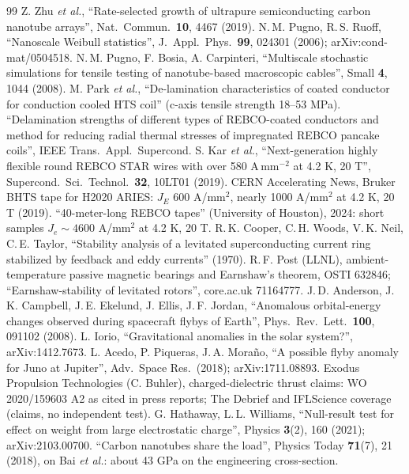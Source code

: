\begin{thebibliography}{99}
 Z. Zhu \emph{et al.}, ``Rate-selected growth of ultrapure semiconducting carbon nanotube arrays'', Nat.\ Commun.\ \textbf{10}, 4467 (2019).
 N.\,M. Pugno, R.\,S. Ruoff, ``Nanoscale Weibull statistics'', J.\ Appl.\ Phys.\ \textbf{99}, 024301 (2006); arXiv:cond-mat/0504518.
 N.\,M. Pugno, F. Bosia, A. Carpinteri, ``Multiscale stochastic simulations for tensile testing of nanotube-based macroscopic cables'', Small \textbf{4}, 1044 (2008).
 M. Park \emph{et al.}, ``De-lamination characteristics of coated conductor for conduction cooled HTS coil'' (c-axis tensile strength 18--53 MPa).
 ``Delamination strengths of different types of REBCO-coated conductors and method for reducing radial thermal stresses of impregnated REBCO pancake coils'', IEEE Trans.\ Appl.\ Supercond.
 S. Kar \emph{et al.}, ``Next-generation highly flexible round REBCO STAR wires with over 580 A\,mm$^{-2}$ at 4.2 K, 20 T'', Supercond.\ Sci.\ Technol.\ \textbf{32}, 10LT01 (2019).
 CERN Accelerating News, Bruker BHTS tape for H2020 ARIES: $J_E$ 600 A/mm$^2$, nearly 1000 A/mm$^2$ at 4.2 K, 20 T (2019).
 ``40-meter-long REBCO tapes'' (University of Houston), 2024: short samples $J_e\sim4600$ A/mm$^2$ at 4.2 K, 20 T.
 R.\,K. Cooper, C.\,H. Woods, V.\,K. Neil, C.\,E. Taylor, ``Stability analysis of a levitated superconducting current ring stabilized by feedback and eddy currents'' (1970).
 R.\,F. Post (LLNL), ambient-temperature passive magnetic bearings and Earnshaw's theorem, OSTI 632846; ``Earnshaw-stability of levitated rotors'', core.ac.uk 71164777.
 J.\,D. Anderson, J.\,K. Campbell, J.\,E. Ekelund, J. Ellis, J.\,F. Jordan, ``Anomalous orbital-energy changes observed during spacecraft flybys of Earth'', Phys.\ Rev.\ Lett.\ \textbf{100}, 091102 (2008).
 L. Iorio, ``Gravitational anomalies in the solar system?'', arXiv:1412.7673.
 L. Acedo, P. Piqueras, J.\,A. Mora\~no, ``A possible flyby anomaly for Juno at Jupiter'', Adv.\ Space Res.\ (2018); arXiv:1711.08893.
 Exodus Propulsion Technologies (C. Buhler), charged-dielectric thrust claims: WO 2020/159603 A2 as cited in press reports; The Debrief and IFLScience coverage (claims, no independent test).
 G. Hathaway, L.\,L. Williams, ``Null-result test for effect on weight from large electrostatic charge'', Physics \textbf{3}(2), 160 (2021); arXiv:2103.00700.
 ``Carbon nanotubes share the load'', Physics Today \textbf{71}(7), 21 (2018), on Bai \emph{et al.}: about 43 GPa on the engineering cross-section.

\end{thebibliography}
